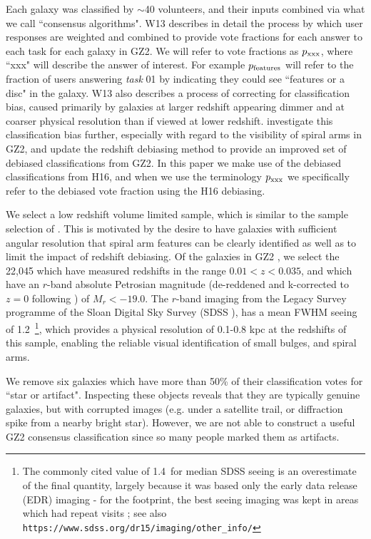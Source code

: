 \documentclass[usenatbib]{mn2e}
\begin{document}
Each galaxy was classified by $\sim$40 volunteers, and their inputs combined via what we call ``consensus algorithms". W13 describes in detail the process by which user responses are weighted and combined to provide vote fractions for each answer to each task for each galaxy in GZ2. We will refer to vote fractions as $p_{\rm xxx}$, where ``xxx" will describe the answer of interest. For example $p_{\rm features}$ will refer to the fraction of users answering {\it task} 01 by indicating they could see ``features or a disc" in the galaxy. W13 also describes a process of correcting for classification bias, caused primarily by galaxies at larger redshift appearing dimmer and at coarser physical resolution than if viewed at lower redshift. \citet[hereafter H16]{Hart2016} investigate this classification bias further, especially with regard to the visibility of spiral arms in GZ2, and update the redshift debiasing method to provide an improved set of debiased classifications from GZ2. In this paper we make use of the debiased classifications from H16, and when we use the terminology $p_{\rm xxx}$ we specifically refer to the debiased vote fraction using the H16 debiasing.

We select a low redshift volume limited sample, which is similar to the sample selection of \citet{Hart2016, Hart2017a}. This is motivated by the desire to have galaxies with sufficient angular resolution that spiral arm features can be clearly identified as well as to limit the impact of redshift debiasing.  Of the galaxies in GZ2 \citep{DR7,Strauss2002}, we select the 22,045 which have measured redshifts in the range $0.01<z<0.035$, and which have an $r$-band absolute Petrosian magnitude (de-reddened and k-corrected to $z=0$ following \citealt{Bamford2009}) of $M_r < -19.0$. The $r$-band imaging from the Legacy Survey programme of the Sloan Digital Sky Survey (SDSS \citealt{York2000}), has a mean FWHM seeing of 1.2\arcsec ~\citep{Kruk2018}\footnote{The commonly cited value of 1.4\arcsec ~for median SDSS seeing is an overestimate of the final quantity, largely because it was based only the early data release (EDR) imaging -  for the 
 footprint, the best seeing imaging was kept in areas which had repeat visits \citep{Ross2011}; see also {\tt https://www.sdss.org/dr15/imaging/other\_info/}}, which provides a physical resolution of 0.1-0.8 kpc at the redshifts of this sample, enabling the reliable visual identification of small bulges, and spiral arms. 

 We remove {six} galaxies which have more than 50\% of their classification votes for ``star or artifact". Inspecting these objects reveals that they are typically genuine galaxies, but with corrupted images (e.g. under a satellite trail, or diffraction spike from a nearby bright star). However, we are not able to construct a useful GZ2 consensus classification since so many people marked them as artifacts.
\end{document}
